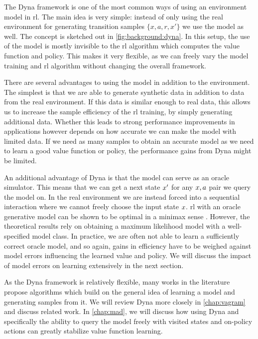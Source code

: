 The Dyna framework \parencite{dyna} is one of the most common ways of using an environment model in \ac{rl}.
The main idea is very simple: instead of only using the real environment for generating transition samples $\{x,a,r,x'\}$ we use the model as well.
The concept is sketched out in \autoref{fig:background:dyna}.
In this setup, the use of the model is mostly invisible to the \ac{rl} algorithm which computes the value function and policy.
This makes it very flexible, as we can freely vary the model training and \ac{rl} algorithm without changing the overall framework.

There are several advantages to using the model in addition to the environment.
The simplest is that we are able to generate synthetic data in addition to data from the real environment.
If this data is similar enough to real data, this allows us to increase the sample efficiency of the \ac{rl} training, by simply generating additional data.
Whether this leads to strong performance improvements in applications however depends on how accurate we can make the model with limited data.
If we need as many samples to obtain an accurate model as we need to learn a good value function or policy, the performance gains from Dyna might be limited.

An additional advantage of Dyna is that the model can serve as an oracle simulator.
This means that we can get a next state $x'$ for any $x,a$ pair we query the model on.
In the real environment we are instead forced into a sequential interaction where we cannot freely choose the input state $x$.
\ac{rl} with an oracle generative model can be shown to be optimal in a minimax sense \parencite{agarwal2020model}.
However, the theoretical results rely on obtaining a maximum likelihood model with a well-specified model class.
In practice, we are often not able to learn a sufficiently correct oracle model, and so again, gains in efficiency have to be weighed against model errors influencing the learned value and policy.
We will discuss the impact of model errors on learning extensively in the next section.

As the Dyna framework is relatively flexible, many works in the literature propose algorithms which build on the general idea of learning a model and generating samples from it.
We will review Dyna more closely in \autoref{chap:vagram} and discuss related work.
In \autoref{chap:mad}, we will discuss how using Dyna and specifically the ability to query the model freely with visited states and on-policy actions can greatly stabilize value function learning.

